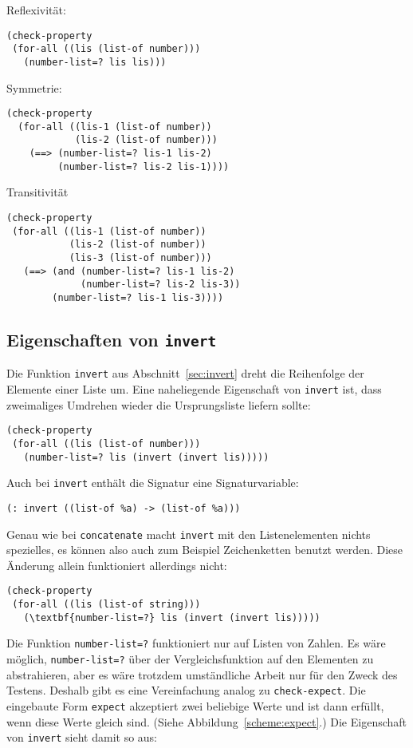 Reflexivität:
%
\begin{lstlisting}
(check-property
 (for-all ((lis (list-of number)))
   (number-list=? lis lis)))
\end{lstlisting}
Symmetrie:
\begin{lstlisting}
(check-property
  (for-all ((lis-1 (list-of number))
            (lis-2 (list-of number)))
    (==> (number-list=? lis-1 lis-2)
         (number-list=? lis-2 lis-1))))
\end{lstlisting}
 Transitivität
\begin{lstlisting}
(check-property
 (for-all ((lis-1 (list-of number))
           (lis-2 (list-of number))
           (lis-3 (list-of number)))
   (==> (and (number-list=? lis-1 lis-2)
             (number-list=? lis-2 lis-3))
        (number-list=? lis-1 lis-3))))
\end{lstlisting}
%

\subsection{Eigenschaften von \lstinline{invert}}

Die Funktion \lstinline{invert} aus Abschnitt~\ref{sec:invert} dreht die
Reihenfolge der Elemente einer Liste um.  Eine naheliegende
Eigenschaft von \lstinline{invert} ist, dass zweimaliges Umdrehen wieder
die Ursprungsliste liefern sollte:
%
\begin{lstlisting}
(check-property
 (for-all ((lis (list-of number)))
   (number-list=? lis (invert (invert lis)))))
\end{lstlisting}
%
Auch bei \lstinline{invert} enthält die Signatur eine Signaturvariable:
%
\begin{lstlisting}
(: invert ((list-of %a) -> (list-of %a)))
\end{lstlisting}
%
Genau wie bei \lstinline{concatenate} macht \lstinline{invert} mit den
Listenelementen nichts spezielles, es können also auch zum Beispiel Zeichenketten
benutzt werden.  Diese Änderung allein funktioniert allerdings nicht:
%
\begin{lstlisting}
(check-property
 (for-all ((lis (list-of string)))
   (\textbf{number-list=?} lis (invert (invert lis)))))
\end{lstlisting}
%
Die Funktion \lstinline{number-list=?} funktioniert nur auf Listen von
Zahlen.  Es wäre möglich, \lstinline{number-list=?} über der
Vergleichsfunktion auf den Elementen zu abstrahieren, aber es wäre
trotzdem umständliche Arbeit nur für den Zweck des Testens.  Deshalb 
gibt es eine Vereinfachung analog zu \lstinline{check-expect}.  Die eingebaute Form \lstinline{expect}
akzeptiert zwei beliebige Werte und ist dann erfüllt, wenn diese Werte
gleich sind.  (Siehe Abbildung~\ref{scheme:expect}.)  Die Eigenschaft
von \lstinline{invert} sieht damit so aus:

